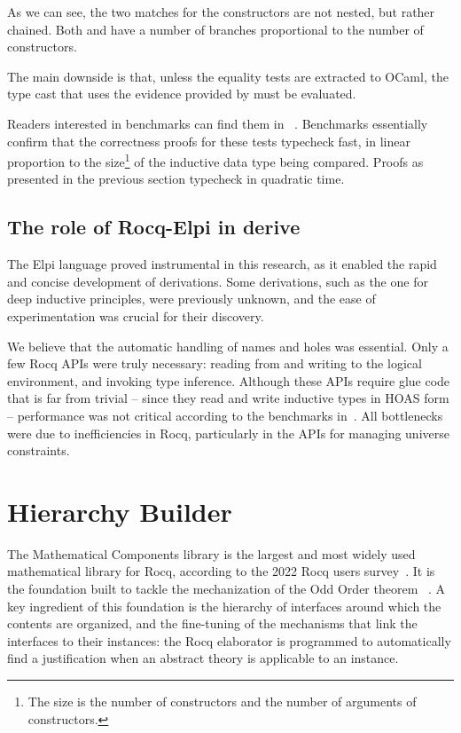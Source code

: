 \documentclass{these-ISSS}
\begin{document}
As we can see, the two matches for the constructors are not nested, but rather
chained. Both  and  have a number of branches
proportional to the number of constructors.


The main downside is that, unless the equality tests are extracted to OCaml,
the type cast that uses the evidence provided by  must be
evaluated.

Readers interested in benchmarks can find them in
~\cite{gregoire:hal-03800154}. Benchmarks essentially confirm
that the correctness proofs for these tests typecheck fast, in linear proportion
to the size\footnote{The size is the number of constructors and the number of arguments of constructors.} of the inductive data type being compared.
Proofs as presented in the previous section typecheck in quadratic time.

\subsection{The role of Rocq-Elpi in derive}
The Elpi language proved instrumental in this research, as it enabled the
rapid and concise development of derivations. Some derivations, such as the one
for deep inductive principles, were previously unknown, and the ease of
experimentation was crucial for their discovery.

We believe that the automatic handling of names and holes was essential. Only a
few Rocq APIs were truly necessary: reading from and writing to the logical
environment, and invoking type inference. Although these APIs require glue code
that is far from trivial -- since they read and write inductive types in HOAS
form -- performance was not critical according to the benchmarks in~\cite{gregoire:hal-03800154}. All bottlenecks were due to inefficiencies
in Rocq, particularly in the APIs for managing universe constraints.


\newpage\section{Hierarchy Builder}\label{sec:hb}


The Mathematical Components library is the largest and most widely used
mathematical library for Rocq, according to the 2022 Rocq users
survey~\cite{dealmeidaborges_et_al:LIPIcs.ITP.2023.12}. It is the foundation
built to tackle the mechanization of the Odd Order theorem
~\cite{DBLP:conf/itp/GonthierAABCGRMOBPRSTT13}. A key ingredient of this
foundation is the hierarchy of interfaces around which the contents are
organized, and the fine-tuning of the mechanisms that link the interfaces to
their instances: the Rocq elaborator is programmed to automatically find a
justification when an abstract theory is applicable to an instance.
\end{document}

